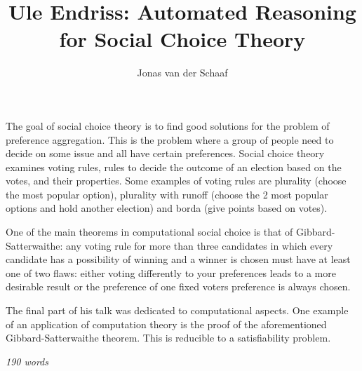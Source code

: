 \documentclass{article}
\title{Ule Endriss: Automated Reasoning for Social Choice Theory}
\author{Jonas van der Schaaf}
\date{}
\begin{document}
\maketitle

The goal of social choice theory is to find good solutions for the problem of
preference aggregation. This is the problem where a group of people need to
decide on some issue and all have certain preferences. Social choice theory
examines voting rules, rules to decide the outcome of an election based on the
votes, and their properties. Some examples of voting rules are plurality (choose
the most popular option), plurality with runoff (choose the 2 most popular
options and hold another election) and borda (give points based on votes).

One of the main theorems in computational social choice is that of
Gibbard-Satterwaithe: any voting rule for more than three candidates in which
every candidate has a possibility of winning and a winner is chosen must have at
least one of two flaws: either voting differently to your preferences leads to a
more desirable result or the preference of one fixed voters preference is always
chosen.

The final part of his talk was dedicated to computational aspects. One example
of an application of computation theory is the proof of the aforementioned
Gibbard-Satterwaithe theorem. This is reducible to a satisfiability problem.

\hfill\emph{190 words}
\end{document}
